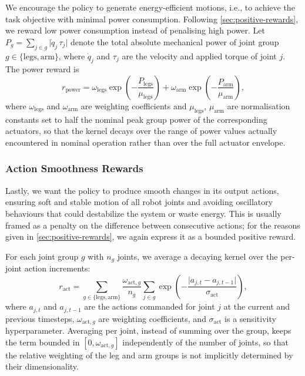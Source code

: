We encourage the policy to generate energy-efficient motions, i.e., to achieve the task objective with minimal power consumption. Following \cref{sec:positive-rewards}, we reward low power consumption instead of penalising high power. Let
$P_{g} = \sum_{j \in g} \lvert \dot{q}_{j}\, \tau_{j} \rvert$
denote the total absolute mechanical power of joint group $g \in \{\text{legs}, \text{arm}\}$, where $\dot{q}_j$ and $\tau_j$ are the velocity and applied torque of joint $j$. The power reward is
%
\begin{equation}
    r_{\text{power}} =
    \omega_{\text{legs}} \exp\!\left(-\frac{P_{\text{legs}}}{\mu_{\text{legs}}}\right)
    + \omega_{\text{arm}} \exp\!\left(-\frac{P_{\text{arm}}}{\mu_{\text{arm}}}\right),
    \label{eq:power-rew}
\end{equation}
%
where $\omega_{\text{legs}}$ and $\omega_{\text{arm}}$ are weighting coefficients and $\mu_{\text{legs}}$, $\mu_{\text{arm}}$ are normalisation constants set to half the nominal peak group power of the corresponding actuators, so that the kernel decays over the range of power values actually encountered in nominal operation rather than over the full actuator envelope.

\subsubsection{Action Smoothness Rewards}

Lastly, we want the policy to produce smooth changes in its output actions, ensuring soft and stable motion of all robot joints and avoiding oscillatory behaviours that could destabilize the system or waste energy. This is usually framed as a penalty on the difference between consecutive actions; for the reasons given in \cref{sec:positive-rewards}, we again express it as a bounded positive reward.

For each joint group $g$ with $n_g$ joints, we average a decaying kernel over the per-joint action increments:
%
\begin{equation}
    r_{\text{act}} = \!\!\sum_{g \in \{\text{legs},\text{arm}\}}\!\!
    \frac{\omega_{\text{act},g}}{n_g}
    \sum_{j \in g}
    \exp\!\left(-\frac{\lvert a_{j,t} - a_{j,t-1} \rvert}{\sigma_{\text{act}}}\right),
    \label{eq:act-rew}
\end{equation}
%
where $a_{j,t}$ and $a_{j,t-1}$ are the actions commanded for joint $j$ at the current and previous timesteps, $\omega_{\text{act},g}$ are weighting coefficients, and $\sigma_{\text{act}}$ is a sensitivity hyperparameter. Averaging per joint, instead of summing over the group, keeps the term bounded in $[0,\omega_{\text{act},g}]$ independently of the number of joints, so that the relative weighting of the leg and arm groups is not implicitly determined by their dimensionality.

